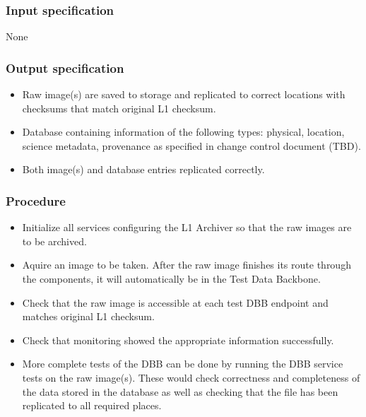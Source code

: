 \documentclass[DM,lsstdraft,STS,toc]{lsstdoc}
\begin{document}
\subsubsection{Input specification}
None


\subsubsection{Output specification}
\begin{itemize}
\item{Raw image(s) are saved to storage and replicated to correct locations with checksums that match
original L1 checksum.}
\item{Database containing information of the following types: physical, location, science metadata,
provenance as specified in change control document (TBD).}
\item{Both image(s) and database entries replicated correctly.}
\end{itemize}


\subsubsection{Procedure}
\begin{itemize}
\item{Initialize all services configuring the L1 Archiver so that the raw images are to be archived.}
\item{Aquire an image to be taken. After the raw image finishes its route through the components, it
will automatically be in the Test Data Backbone.}
\item{Check that the raw image is accessible at each test DBB endpoint and matches original L1 checksum.}
\item{Check that monitoring showed the appropriate information successfully.}
\item{More complete tests of the DBB can be done by running the DBB
service tests on the raw image(s). These would check correctness
and completeness of the data stored in the database as well as
checking that the file has been replicated to all required places.}
\end{itemize}
\end{document}

